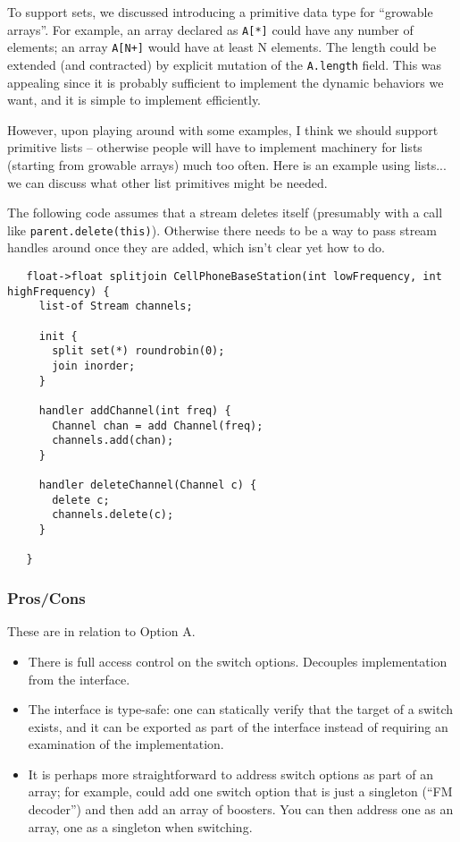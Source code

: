 \documentclass{tr}
\begin{document}

To support sets, we discussed introducing a primitive data type for
``growable arrays''.  For example, an array declared as \verb+A[*]+
could have any number of elements; an array \verb-A[N+]- would have at
least N elements.  The length could be extended (and contracted) by
explicit mutation of the \verb+A.length+ field.  This was appealing
since it is probably sufficient to implement the dynamic behaviors we
want, and it is simple to implement efficiently.

However, upon playing around with some examples, I think we should
support primitive lists -- otherwise people will have to implement
machinery for lists (starting from growable arrays) much too often.
Here is an example using lists... we can discuss what other list
primitives might be needed.

The following code assumes that a stream deletes itself (presumably
with a call like \verb+parent.delete(this)+).  Otherwise there needs
to be a way to pass stream handles around once they are added, which
isn't clear yet how to do.

\begin{verbatim}
   float->float splitjoin CellPhoneBaseStation(int lowFrequency, int highFrequency) {
     list-of Stream channels;

     init {
       split set(*) roundrobin(0);
       join inorder;
     }
     
     handler addChannel(int freq) {
       Channel chan = add Channel(freq);
       channels.add(chan);
     }

     handler deleteChannel(Channel c) {
       delete c;
       channels.delete(c);
     }

   }
\end{verbatim}

\subsubsection {Pros/Cons}

These are in relation to Option A.


\begin{itemize}

\item There is full access control on the switch options.  Decouples
implementation from the interface.

\item The interface is type-safe: one can statically verify that the
target of a switch exists, and it can be exported as part of the
interface instead of requiring an examination of the implementation.

\item It is perhaps more straightforward to address switch options as
part of an array; for example, could add one switch option that is
just a singleton (``FM decoder'') and then add an array of boosters.
You can then address one as an array, one as a singleton when
switching.

\end{itemize}
\end{document}
